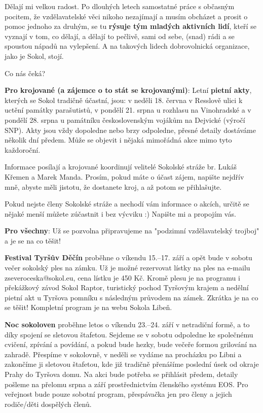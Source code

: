 \documentclass[11pt]{article}
\newcommand{\subpost}[1]{%
\vspace*{12pt}
\begin{center}
{\Large \tyrs #1}
\end{center}}
\begin{document}
Dělají mi velkou radost. Po dlouhých letech samostatné práce s občasným pocitem, že vzdělavatelské věci nikoho nezajímají a musím obcházet a prosit o pomoc jednoho za druhým, se tu \textbf{rýsuje tým mladých aktivních lidí}, kteří se vyznají v tom, co dělají, a dělají to pečlivě, sami od sebe, (snad) rádi a se spoustou nápadů na vylepšení. A na takových lidech dobrovolnická organizace, jako je Sokol, stojí.


\subpost{Co nás čeká?}
\textbf{Pro krojované (a zájemce o to stát se krojovanými)}:
Letní \textbf{pietní akty}, kterých se Sokol tradičně účastní, jsou: v neděli 18. června v Resslově ulici k uctění památky parašutistů, v pondělí 21. srpna u rozhlasu na Vinohradské a v pondělí 28. srpna u památníku československým vojákům na Dejvické (výročí SNP). Akty jsou vždy dopoledne nebo brzy odpoledne, přesné detaily dostáváme několik dní předem. Může se objevit i nějaká mimořádná akce mimo tyto každoroční.

Informace posílají a krojované koordinují velitelé Sokolské stráže br. Lukáš Křemen a Marek Manda. Prosím, pokud máte o účast zájem, napište nejdřív mně, abyste měli jistotu, že dostanete kroj, a až potom se přihlašujte.

Pokud nejste členy Sokolské stráže  a nechodí vám informace o akcích, určitě se nějaké menší můžete zúčastnit i bez výcviku :) Napište mi a propojím vás.


\textbf{Pro všechny}: Už se pozvolna připravujeme na "podzimní vzdělavatelský trojboj" a je se na co těšit!

\textbf{Festival Tyršův Děčín} proběhne o víkendu 15.–17. září a opět bude v sobotu večer sokolský ples na zámku. Už je možné rezervovat lístky na ples na e-mailu zseveroceska@sokol.eu, cena lístku je 450 Kč. Kromě plesu je na programu i překážkový závod Sokol Raptor, turistický pochod Tyršovým krajem a nedělní pietní akt u Tyršova pomníku s následným průvodem na zámek. Zkrátka je na co se těšit! Kompletní program je na webu Sokola Libeň.

\textbf{Noc sokoloven} proběhne letos o víkendu 23.–24. září v netradiční formě, a to díky spojení se sletovou štafetou. Sejdeme se v sobotu odpoledne ke společnému cvičení, zpívání a povídání, a pokud bude hezky, bude večeře formou grilování na zahradě. Přespíme v sokolovně, v neděli se vydáme na procházku po Libni a zakončíme ji sletovou štafetou, kde již tradičně přenášíme poslední úsek od okraje Prahy do Tyršova domu. Na akci bude potřeba se přihlásit předem, detaily pošleme na přelomu srpna a září prostřednictvím členského systému EOS. Pro veřejnost bude pouze sobotní program, přespávačka jen pro členy a jejich rodiče/děti dospělých členů.
\end{document}
